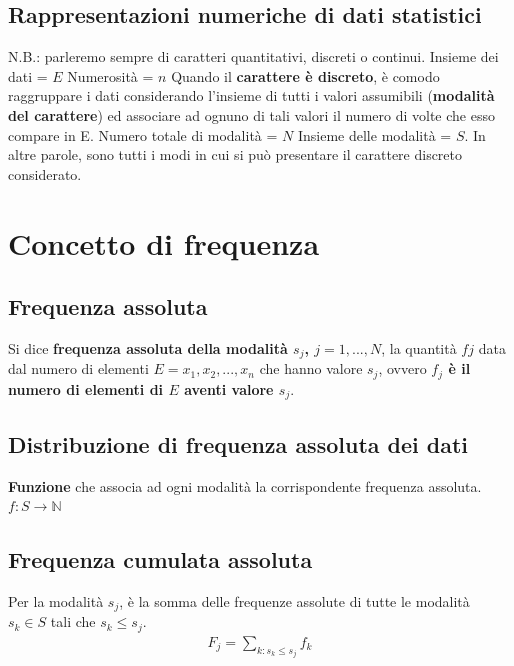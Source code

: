\subsection{Rappresentazioni numeriche di dati statistici}
N.B.: parleremo sempre di caratteri quantitativi, discreti o continui. \newline
Insieme dei dati = $E$ \newline
Numerosità = $n$ \newline
Quando il \textbf{carattere è discreto}, è comodo raggruppare i dati considerando l'insieme di tutti i valori assumibili (\textbf{modalità del carattere}) ed associare ad ognuno di tali valori il numero di volte che esso compare in E. \newline
Numero totale di modalità = $N$ \newline
Insieme delle modalità = $S$. In altre parole, sono tutti i modi in cui si può presentare il carattere discreto considerato.

\section{Concetto di frequenza}
\subsection{Frequenza assoluta}
Si dice \textbf{frequenza assoluta della modalità $s_j$, $j = 1, ..., N$}, la quantità $fj$ data dal numero di elementi $E = {x_1, x_2, ..., x_n}$ che hanno valore $s_j$, ovvero \textbf{$f_j$ è il numero di elementi di $E$ aventi valore $s_j$}.

\subsection{Distribuzione di frequenza assoluta dei dati}
\textbf{Funzione} che associa ad ogni modalità la corrispondente frequenza assoluta. \newline
$f: S \rightarrow \mathbb{N}$ 

\subsection{Frequenza cumulata assoluta}
Per la modalità $s_j$, è la somma delle frequenze assolute di tutte le modalità $s_k \in S$ tali che $s_k \leq s_j$.
\begin{align}
	F_j = \sum_{k: s_k \leq s_j} f_k
\end{align}


